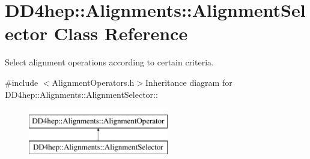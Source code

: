 \hypertarget{class_d_d4hep_1_1_alignments_1_1_alignment_selector}{
\section{DD4hep::Alignments::AlignmentSelector Class Reference}
\label{class_d_d4hep_1_1_alignments_1_1_alignment_selector}
}


Select alignment operations according to certain criteria.  


{\ttfamily \#include $<$AlignmentOperators.h$>$}Inheritance diagram for DD4hep::Alignments::AlignmentSelector::\begin{figure}[H]
\begin{center}
\leavevmode
\includegraphics[height=2cm]{class_d_d4hep_1_1_alignments_1_1_alignment_selector}
\end{center}
\end{figure}
